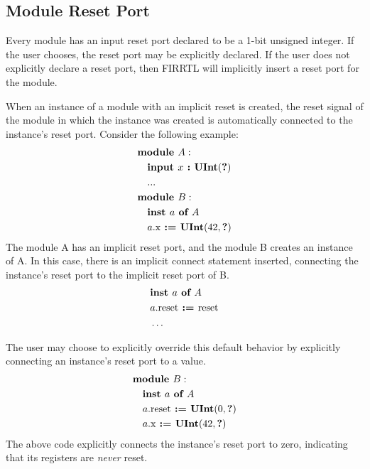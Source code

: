 \documentclass[12pt]{article}
\begin{document}
\subsection{Module Reset Port}
Every module has an input reset port declared to be a 1-bit unsigned integer.
If the user chooses, the reset port may be explicitly declared.
If the user does not explicitly declare a reset port, then FIRRTL will implicitly insert a reset port for the module. 

When an instance of a module with an implicit reset is created, the reset signal of the module in which the instance was created is automatically connected to the instance's reset port.
Consider the following example:
\[
\begin{aligned}
&\kw{module} A :                               \\
&\quad \kw{input} x \kw{ :} \kws{UInt}(\kws{?})\\
&\quad   ...                                   \\
&\kw{module} B :                               \\
&\quad \kw{inst} a \kw{ of} A                  \\
&\quad a.\text{x} \kw{ :=} \kws{UInt}(42, \kws{?})    \\
\end{aligned}
\]
The module A has an implicit reset port, and the module B creates an instance of A.
In this case, there is an implicit connect statement inserted, connecting the instance's reset port to the implicit reset port of B. 
\[
\begin{aligned}
&\kw{inst} a \kw{ of} A                  \\
&a.\text{reset} \kw{ :=} \text{reset}    \\
&\ldots
\end{aligned}
\]

The user may choose to explicitly override this default behavior by explicitly connecting an instance's reset port to a value.
\[
\begin{aligned}
&\kw{module} B :                                       \\
&\quad \kw{inst} a \kw{ of} A                          \\
&\quad a.\text{reset} \kw{ :=} \kws{UInt}(0, \kws{?})  \\
&\quad a.\text{x} \kw{ :=} \kws{UInt}(42, \kws{?})     \\
\end{aligned}
\]
The above code explicitly connects the instance's reset port to zero, indicating that its registers are {\em never} reset. 
\end{document}
